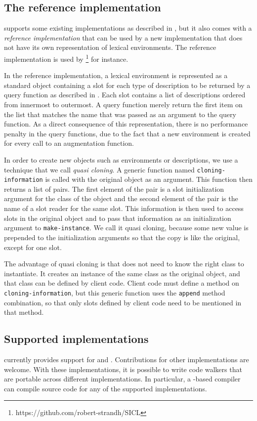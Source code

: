 \subsection{The reference implementation}

\trucler{} supports some existing \commonlisp{} implementations as
described in , but it also
comes with a \emph{reference implementation} that can be used by a new
\commonlisp{} implementation that does not have its own representation
of lexical environments.  The reference implementation is used by
\sicl{}%
\footnote{https://github.com/robert-strandh/SICL} for instance.

In the reference implementation, a lexical environment is represented
as a standard object containing a slot for each type of description to
be returned by a query function as described in
.  Each slot contains a list of
descriptions ordered from innermost to outermost.  A query function
merely return the first item on the list that matches the name that
was passed as an argument to the query function.  As a direct
consequence of this representation, there is no performance penalty in
the query functions, due to the fact that a new environment is created
for every call to an augmentation function.

In order to create new objects such as environments or descriptions,
we use a technique that we call \emph{quasi cloning}.  A generic
function named \texttt{cloning-information} is called with the
original object as an argument.  This function then returns a list of
pairs.  The first element of the pair is a slot initialization argument
for the class of the object and the second element of the pair is the
name of a slot reader for the same slot.  This information is then
used to access slots in the original object and to pass that
information as an initialization argument to \texttt{make-instance}.
We call it quasi cloning, because some new value is prepended to the
initialization arguments so that the copy is like the original, except
for one slot.

The advantage of quasi cloning is that \trucler{} does not need to know
the right class to instantiate.  It creates an instance of the same
class as the original object, and that class can be defined by client
code.  Client code must define a method on
\texttt{cloning-information}, but this generic function uses the
\texttt{append} method combination, so that only slots defined by
client code need to be mentioned in that method.

\subsection{Supported \commonlisp{} implementations}
\label{trucler-supported-implementations}

\trucler{} currently provides support for \sbcl{} and \ccl{}.
Contributions for other \commonlisp{} implementations are welcome.
With these implementations, it is possible to write code walkers that
are portable across different \commonlisp{} implementations.  In
particular, a \cleavir{}-based compiler can compile source code for
any of the supported implementations.
